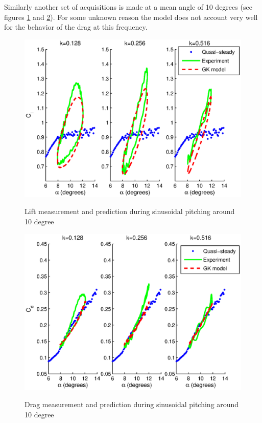 \FloatBarrier

\par Similarly another set of acquisitions is made at a mean angle of 10 degrees (see figures \ref{fig:Pitching_allcases_GK_Cl_10} and \ref{fig:Pitching_allcases_GK_Cd_10}).
For some unknown reason the model does not account very well for the behavior of the drag at this frequency.

\begin{figure}[h]
  \begin{center}
    \scalebox{0.85}  
    {\includegraphics{./Figures/Pitching_allcases_GK_CL_10_amp_2.eps}}
  \end{center}
  \caption{Lift measurement and prediction during sinusoidal pitching around 10 degree} 
  \label{fig:Pitching_allcases_GK_Cl_10}
\end{figure}

\begin{figure}[h]
  \begin{center}
    \scalebox{0.85}  
    {\includegraphics{./Figures/Pitching_allcases_GK_CD_10_amp_2.eps}}
  \end{center}
  \caption{Drag measurement and prediction during sinusoidal pitching around 10 degree} 
  \label{fig:Pitching_allcases_GK_Cd_10}
\end{figure}


